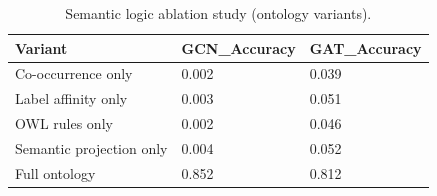 \begin{table}[t]
\centering
\small
\begin{tabular}{lll}
\toprule
Variant & GCN\_Accuracy & GAT\_Accuracy \\
\midrule
Co-occurrence only & 0.002 & 0.039 \\
Label affinity only & 0.003 & 0.051 \\
OWL rules only & 0.002 & 0.046 \\
Semantic projection only & 0.004 & 0.052 \\
Full ontology & 0.852 & 0.812 \\
\bottomrule
\end{tabular}

\caption{Semantic logic ablation study (ontology variants).}
\label{tab:semantic_ablation}
\end{table}
